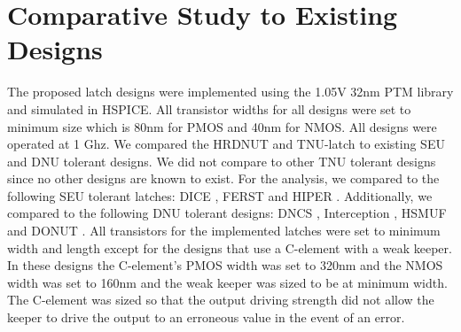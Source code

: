 \section{Comparative Study to Existing Designs} \label{sec:res}

The proposed latch designs were implemented using the 1.05V 32nm PTM library \cite{PTM} and simulated in HSPICE. All transistor widths for all designs were set to minimum size which is 80nm for PMOS and 40nm for NMOS. All designs were operated at 1 Ghz. We compared the HRDNUT and TNU-latch to existing SEU and DNU tolerant designs. We did not compare to other TNU tolerant designs since no other designs are known to exist. For the analysis, we compared to the following SEU tolerant latches: DICE \cite{DICE}, FERST \cite{FERST} and HIPER \cite{HIPER}. Additionally, we compared to the following DNU tolerant designs: DNCS \cite{DNCS}, Interception \cite{Inter}, HSMUF \cite{HSMUF} and DONUT \cite{DONUT}. All transistors for the implemented latches were set to minimum width and length except for the designs that use a C-element with a weak keeper. In these designs the C-element's PMOS width was set to 320nm and the NMOS width was set to 160nm and the weak keeper was sized to be at minimum width. The C-element was sized so that the output driving strength did not allow the keeper to drive the output to an erroneous value in the event of an error. 

